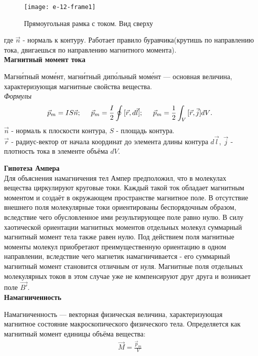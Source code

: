 \documentclass[__main__.tex]{subfiles}
\begin{document}
\begin{wrapfigure}[14]{l!}{0.3\linewidth}
	\texttt{[image: e-12-frame1]}
	\caption{Прямоугольная рамка с током. Вид сверху}
	\label{e-12-frame1}
\end{wrapfigure}
где $\vec{n}$ - нормаль к контуру. Работает правило буравчика(крутишь по направлению тока, двигаешься по направлению магнитного момента).\\
\textbf{Магнитный момент тока}
\begin{definition}[По википедии]
Магни́тный моме́нт, магни́тный дипо́льный моме́нт — основная величина, характеризующая магнитные свойства вещества.\\
\textit{Формулы}
\begin{gather*}
	\vec{p}_m = IS\vec{n}; \hspace{0.5cm}
	\vec{p}_m = \frac{I}{2}\oint{[\vec{r}, d\vec{l}]}; \hspace{0.5cm} \vec{p}_m = \frac{1}{2}\int_{V}{[\vec{r}, \vec{j}]dV}.
\end{gather*}
$\vec{n}$ - нормаль к плоскости контура,\; $S$ - площадь контура.\\
$\vec{r}$ - радиус-вектор от начала координат до элемента длины контура $d\vec{l}$, \; $\vec{j}$ - плотность тока в элементе объёма $dV$.	
\end{definition}
\textbf{Гипотеза Ампера}\\
Для объяснения намагничения тел Ампер предположил, что в молекулах вещества циркулируют круговые токи. Каждый такой ток обладает магнитным моментом и создаёт в окружающем пространстве магнитное поле. В отсутствие внешнего поля молекулярные токи ориентированы беспорядочным образом, вследствие чего обусловленное ими результирующее поле равно нулю. В силу хаотической ориентации магнитных моментов отдельных молекул суммарный магнитный момент тела также равен нулю. Под действием поля магнитные моменты молекул приобретают преимущественную ориентацию в одном направлении, вследствие чего магнетик намагничивается - его суммарный магнитный момент становится отличным от нуля. Магнитные поля отдельных молекулярных токов в этом случае уже не компенсируют друг друга и возникает поле $\vec{B'}$.\\
\textbf{Намагниченность}
\begin{definition}[википедия]
	Намагниченность — векторная физическая величина, характеризующая магнитное состояние макроскопического физического тела. Определяется как магнитный момент единицы объёма вещества:
	\begin{gather*}
		\vec{M} = \frac{\vec{p}_m}{V}
	\end{gather*}
\end{definition}
\end{document}
